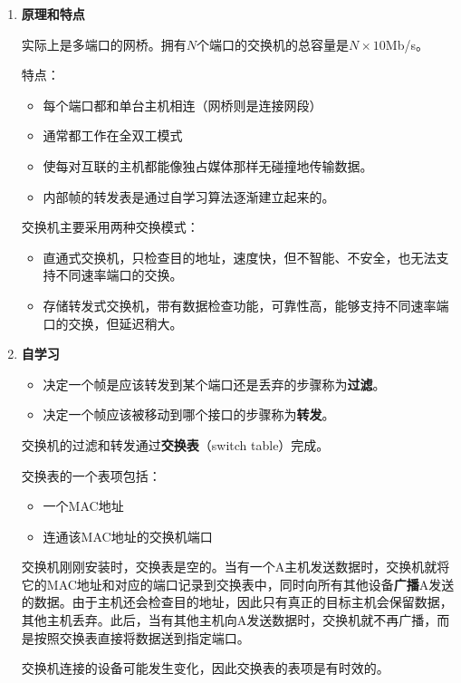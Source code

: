 \documentclass[12pt, a4paper, oneside]{ctexart}
\begin{document}
\begin{enumerate}
    \item {\bf 原理和特点}
    
    实际上是多端口的网桥。拥有$N$个端口的交换机的总容量是$N\times 10$Mb/s。

    特点：
    \begin{itemize}
        \item 每个端口都和单台主机相连（网桥则是连接网段）
        \item 通常都工作在全双工模式
        \item 使每对互联的主机都能像独占媒体那样无碰撞地传输数据。
        \item 内部帧的转发表是通过自学习算法逐渐建立起来的。
    \end{itemize}

    交换机主要采用两种交换模式：
    \begin{itemize}
        \item 直通式交换机，只检查目的地址，速度快，但不智能、不安全，也无法支持不同速率端口的交换。
        \item 存储转发式交换机，带有数据检查功能，可靠性高，能够支持不同速率端口的交换，但延迟稍大。
    \end{itemize}
    \item {\bf 自学习}
    
    \begin{itemize}
        \item 决定一个帧是应该转发到某个端口还是丢弃的步骤称为\textbf{过滤}。
        \item 决定一个帧应该被移动到哪个接口的步骤称为\textbf{转发}。
    \end{itemize}

    交换机的过滤和转发通过\textbf{交换表}（switch table）完成。

    交换表的一个表项包括：
    \begin{itemize}
        \item 一个MAC地址
        \item 连通该MAC地址的交换机端口
    \end{itemize}

    交换机刚刚安装时，交换表是空的。当有一个A主机发送数据时，交换机就将它的MAC地址和对应的端口记录到交换表中，同时向所有其他设备\textbf{广播}A发送的数据。由于主机还会检查目的地址，因此只有真正的目标主机会保留数据，其他主机丢弃。此后，当有其他主机向A发送数据时，交换机就不再广播，而是按照交换表直接将数据送到指定端口。

    交换机连接的设备可能发生变化，因此交换表的表项是有时效的。
\end{enumerate}
\end{document}
